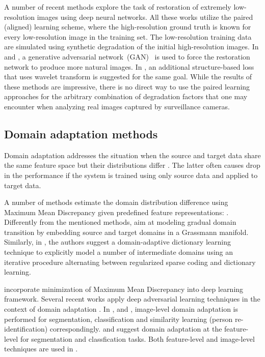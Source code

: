 A number of recent methods \cite{TuzelTH16,ZhuLLT16,xu2017learning,huang2017wavelet} explore the task of restoration of extremely low-resolution images using deep neural networks. All these works utilize the paired (aligned) learning scheme, where the high-resolution ground truth is known for every low-resolution image in the training set. The low-resolution training data are simulated using synthetic degradation of the initial high-resolution images. In \cite{xu2017learning} and \cite{TuzelTH16}, a generative adversarial network~(GAN)~\cite{goodfellow2014generative} is used to force the restoration network to produce more natural images. In \cite{huang2017wavelet}, an additional structure-based loss that uses wavelet transform is suggested for the same goal. While the results of these methods are impressive, there is no direct way to use the paired learning approaches for the arbitrary combination of degradation factors that one may encounter when analyzing real images captured by surveillance cameras. 

\subsection{Domain adaptation methods}

Domain adaptation addresses the situation when the source and target data share the same feature space but their distributions differ \cite{wang2018deep}. The latter often causes drop in the performance if the system is trained using only source data and applied to target data.

A number of methods estimate the domain distribution difference using Maximum Mean Discrepancy \cite{borgwardt2006integrating} given predefined feature representations: \cite{huang2007correcting,pan2008transfer,pan2011domain,baktashmotlagh2013unsupervised}. Differently from the mentioned methods, \cite{gong2012geodesic} aim at modeling gradual domain transition by embedding source and target domains in a Grassmann manifold.  Similarly, in \cite{xu2018cross}, the authors suggest a domain-adaptive dictionary learning technique to explicitly model a number of intermediate domains using an iterative procedure alternating between regularized sparse coding and dictionary learning. 

\cite{long2015learning,luo2018deep} incorporate minimization of Maximum Mean Discrepancy into deep learning framework.
Several recent works apply deep adversarial learning techniques in the context of domain adaptation  \cite{Volpi_2018_CVPR,Hong_2018_CVPR,Deng_2018_CVPR,Bousmalis_2017_CVPR,Murez_2018_CVPR}. In \cite{Murez_2018_CVPR}, 
\cite{Bousmalis_2017_CVPR} and \cite{Deng_2018_CVPR}, image-level domain adaptation is performed for segmentation, classification and similarity learning (person re-identification) correspondingly. \cite{Hong_2018_CVPR} and \cite{Volpi_2018_CVPR} suggest domain adaptation at the feature-level for segmentation and classfication tasks. Both feature-level and image-level techniques are used in \cite{Hoffman17}.

